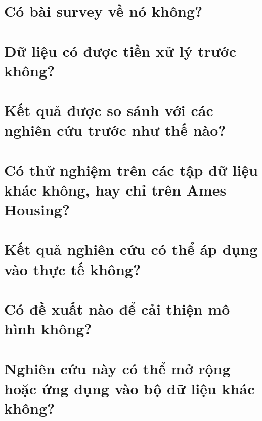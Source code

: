 \documentclass{article}
\begin{document}
\section{Có bài survey về nó không?}


\section{Dữ liệu có được tiền xử lý trước không?}


\section{Kết quả được so sánh với các nghiên cứu trước như thế nào?}


\section{Có thử nghiệm trên các tập dữ liệu khác không, hay chỉ trên Ames Housing?}


\section{Kết quả nghiên cứu có thể áp dụng vào thực tế không?}


\section{Có đề xuất nào để cải thiện mô hình không?}


\section{Nghiên cứu này có thể mở rộng hoặc ứng dụng vào bộ dữ liệu khác không?}

\end{document}
